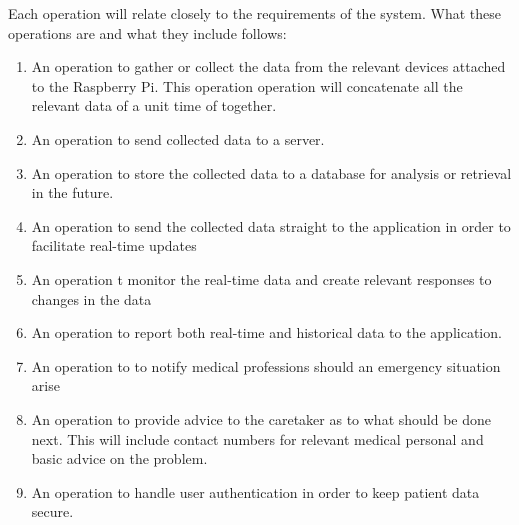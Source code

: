   Each operation will relate closely to the requirements of the system. What these operations are and what they include follows:
			\begin{enumerate}           
            
            \item{An operation to gather or collect the data from the relevant 
            devices attached to the Raspberry Pi. This operation operation will concatenate all the relevant data of a unit time of together.}
            \item{An operation to send collected data to a server.}
            
            \item{An operation to store the collected data to a database for analysis or retrieval in the future.}
            
            \item{An operation to send the collected data straight to the application in order to facilitate real-time updates}
            
            \item{An operation t monitor the real-time data and create relevant responses to changes in the data}
            
            \item{An operation to report both real-time and historical data to the application.}
            
            \item{An operation to to notify medical professions should an emergency situation arise}
            
            \item{An operation to provide advice to the caretaker as to what should be done next. This will include contact numbers for relevant medical personal and basic advice on the problem.}
            
            \item{An operation to handle user authentication in order to keep patient data secure.}
            \end{enumerate}